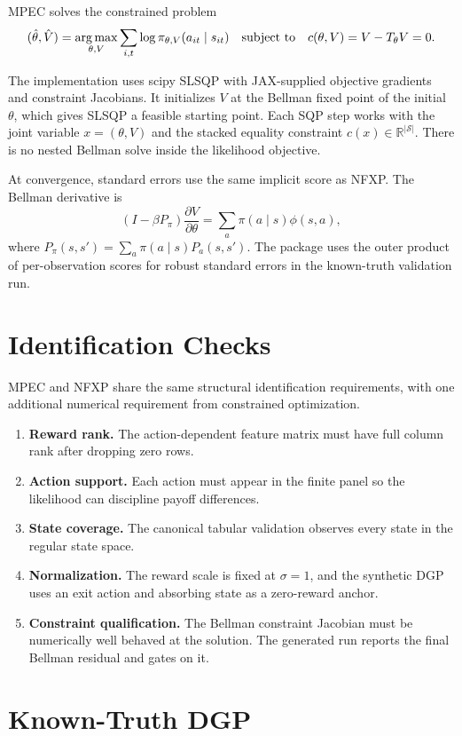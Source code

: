 \documentclass[10pt]{article}
\begin{document}
MPEC solves the constrained problem
\[
(\hat\theta,\hat V)
=
\operatorname*{arg\,max}_{\theta,V}
\sum_{i,t}\log\pi_{\theta,V}(a_{it}\mid s_{it})
\quad
\text{subject to}\quad
c(\theta,V)=V-T_\theta V=0.
\]

The implementation uses scipy SLSQP with JAX-supplied objective gradients and
constraint Jacobians. It initializes \(V\) at the Bellman fixed point of the
initial \(\theta\), which gives SLSQP a feasible starting point. Each SQP step
works with the joint variable \(x=(\theta,V)\) and the stacked equality
constraint \(c(x)\in\mathbb R^{|\mathcal S|}\). There is no nested Bellman
solve inside the likelihood objective.

At convergence, standard errors use the same implicit score as NFXP. The
Bellman derivative is
\[
\left(I-\beta P_\pi\right)\frac{\partial V}{\partial\theta}
=
\sum_a \pi(a\mid s)\phi(s,a),
\]
where \(P_\pi(s,s')=\sum_a\pi(a\mid s)P_a(s,s')\). The package uses the
outer product of per-observation scores for robust standard errors in the
known-truth validation run.

\section{Identification Checks}

MPEC and NFXP share the same structural identification requirements, with one
additional numerical requirement from constrained optimization.

\begin{enumerate}
\item \textbf{Reward rank.} The action-dependent feature matrix must have full
column rank after dropping zero rows.
\item \textbf{Action support.} Each action must appear in the finite panel so
the likelihood can discipline payoff differences.
\item \textbf{State coverage.} The canonical tabular validation observes every
state in the regular state space.
\item \textbf{Normalization.} The reward scale is fixed at \(\sigma=1\), and
the synthetic DGP uses an exit action and absorbing state as a zero-reward
anchor.
\item \textbf{Constraint qualification.} The Bellman constraint Jacobian must
be numerically well behaved at the solution. The generated run reports the
final Bellman residual and gates on it.
\end{enumerate}

\section{Known-Truth DGP}
\end{document}

